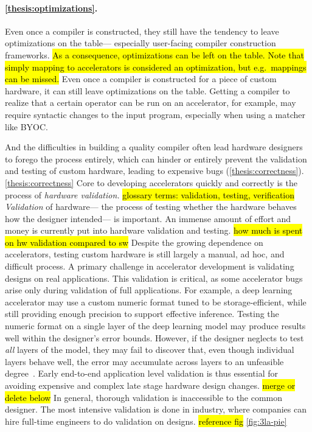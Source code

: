 \paragraph{
\cref{thesis:optimizations}.
}
Even once a compiler is constructed,
  they still have the tendency
  to leave optimizations on the table---%
  especially user-facing compiler construction frameworks.
\hl{As a consequence, optimizations can be left on the table.
Note that simply mapping to accelerators
  is considered an optimization,
  but e.g.~mappings can be missed.}
Even once a compiler
  is constructed
  for a piece of custom hardware,
  it can still leave optimizations
  on the table.
Getting a compiler to realize
  that a certain operator
  can be run on an accelerator,
  for example,
  may require syntactic changes
  to the input program,
  especially when using
  a matcher like
  BYOC.

And the difficulties
  in building a quality compiler
  often lead hardware designers to forego the process
  entirely, which can
  hinder or entirely prevent
  the validation and testing
  of custom hardware,
  leading to expensive bugs
  (\cref{thesis:correctness}).
\cref{thesis:correctness}
Core to developing
  accelerators
  quickly and correctly
  is the process of \textit{hardware validation.}
\hl{glossary terms: validation, testing, verification}
\textit{Validation}
  of hardware---%
  the process of testing
  whether the hardware behaves
  how the designer intended---%
  is important.
An immense amount of effort
  and money
  is currently put
  into hardware validation and testing.
\hl{how much is spent on hw validation compared to sw}  
Despite the growing dependence
  on accelerators,
  testing custom hardware is still largely
  a manual, ad hoc, and difficult process.
A primary challenge in 
  accelerator development
  is validating designs
  on real applications.
This validation
  is critical,
  as some accelerator bugs 
  arise
  only during validation
  of full applications.
For example,
  a deep learning
  accelerator may use
  a custom numeric format
  tuned to be storage-efficient,
  while still providing enough
  precision
  to support effective inference.
Testing the numeric format
  on a single layer
  of the deep learning model
  may produce results
  well within the designer's
  error bounds.
However, if the designer
  neglects to test
  \textit{all}
  layers of the model,
  they may fail to discover that,
  even though individual layers
  behave well,
  the error may accumulate
  across layers
  to an unfeasible degree~\cite{zorn2021rounding}.
Early end-to-end application level validation is thus essential
  for avoiding expensive and complex late stage hardware design changes.
\hl{merge or delete below}
In general,
  thorough validation
  is inaccessible
  to the common designer.
The most intensive validation
  is done in industry,
  where companies can hire full-time
  engineers
  to do validation
  on designs.
\hl{reference fig} \cref{fig:3la-pie}

